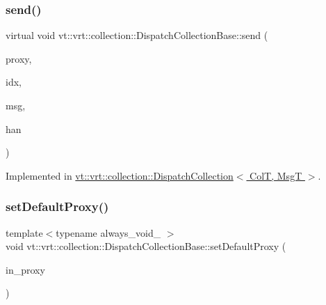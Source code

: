 \mbox{\label{structvt_1_1vrt_1_1collection_1_1_dispatch_collection_base_a7e409e791d9eafb8fea0f4f7d97ad860}} 
\subsubsection{\texorpdfstring{send()}{send()}}
{\footnotesize\ttfamily virtual void vt\+::vrt\+::collection\+::\+Dispatch\+Collection\+Base\+::send (\begin{DoxyParamCaption}\item[{\hyperlink{namespacevt_a1b417dd5d684f045bb58a0ede70045ac}{Virtual\+Proxy\+Type}}]{proxy,  }\item[{void $\ast$}]{idx,  }\item[{void $\ast$}]{msg,  }\item[{\hyperlink{namespacevt_af64846b57dfcaf104da3ef6967917573}{Handler\+Type}}]{han }\end{DoxyParamCaption})\hspace{0.3cm}{\ttfamily [pure virtual]}}



Implemented in \hyperlink{structvt_1_1vrt_1_1collection_1_1_dispatch_collection_a4ecf34d64875a926061d3bec61f24871}{vt\+::vrt\+::collection\+::\+Dispatch\+Collection$<$ Col\+T, Msg\+T $>$}.

\mbox{\label{structvt_1_1vrt_1_1collection_1_1_dispatch_collection_base_a3c5ad977c57108fdcfcc3c2b443428e3}} 
\subsubsection{\texorpdfstring{set\+Default\+Proxy()}{setDefaultProxy()}}
{\footnotesize\ttfamily template$<$typename always\+\_\+void\+\_\+ $>$ \\
void vt\+::vrt\+::collection\+::\+Dispatch\+Collection\+Base\+::set\+Default\+Proxy (\begin{DoxyParamCaption}\item[{\hyperlink{namespacevt_a1b417dd5d684f045bb58a0ede70045ac}{Virtual\+Proxy\+Type} const \&}]{in\+\_\+proxy }\end{DoxyParamCaption})}



